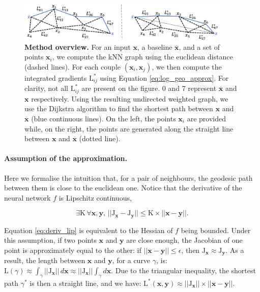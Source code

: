 \begin{figure}[t]
\vskip 0.2in
\begin{center}
\centerline{\includegraphics[width=0.9\textwidth]{figures/method.png}}
\caption{\textbf{Method overview.} For an input $\textbf{x}$, a baseline $\overline{\textbf{x}}$, and a set of points $\textbf{x}_i$, we compute the kNN graph using the euclidean distance (dashed lines). For each couple $(\textbf{x}_i, \textbf{x}_j)$, we then compute the integrated gradients $\textrm{L}^*_{ij}$ using Equation \ref{eq:log_geo_approx}. For clarity, not all $\textrm{L}^*_{ij}$ are present on the figure. 0 and 7 represent $\overline{\textbf{x}}$ and $\textbf{x}$ respectively. Using the resulting undirected weighted graph, we use the Dijkstra algorithm to find the shortest path between $\textbf{x}$ and $\overline{\textbf{x}}$ (blue continuous lines). On the left, the points $\textbf{x}_i$ are provided while, on the right, the points are generated along the straight line between $\textbf{x}$ and $\overline{\textbf{x}}$ (dotted line).}
\label{fig:method}
\end{center}
\vskip -0.2in
\end{figure}

\paragraph{Assumption of the approximation.} 

Here we formalise the intuition that, for a pair of neighbours, the geodesic path between them is close to the euclidean one. Notice that the derivative of the neural network $f$ is Lipschitz continuous,

\begin{equation}
    \exists \textrm{K} \, \forall \textbf{x}, \textbf{y}, \, ||\textrm{J}_{\textbf{x}} - \textrm{J}_{\textbf{y}}|| \leq \textrm{K} \times ||\textbf{x} - \textbf{y}||.
\label{eq:deriv_lip}
\end{equation}

Equation \ref{eq:deriv_lip} is equivalent to the Hessian of $f$ being bounded. Under this assumption, if two points $\textbf{x}$ and $\textbf{y}$ are close enough, the Jacobian of one point is approximately equal to the other: if $||\textbf{x} - \textbf{y}|| \le \epsilon$, then $\textrm{J}_{\textbf{x}} \approx \textrm{J}_{\textbf{y}}$. As a result, the length between $\textbf{x}$ and $\textbf{y}$, for a curve $\gamma$, is: $\textrm{L}(\gamma) \approx \int_{\gamma} ||\textrm{J}_{\textbf{x}}|| \, d\textbf{x} \approx ||\textrm{J}_{\textbf{x}}|| \int_{\gamma} d\textbf{x}$. Due to the triangular inequality, the shortest path $\gamma^*$ is then a straight line, and we have: $\textrm{L}^*(\textbf{x}, \textbf{y}) \approx ||\textrm{J}_{\textbf{x}}|| \times ||\textbf{x} - \textbf{y}||$.

